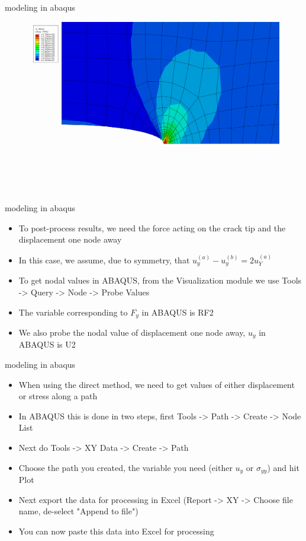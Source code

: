 \documentclass[10pt]{beamer}
\begin{document}
	\begin{frame}{modeling in abaqus}
		\begin{figure}
			\centering
			\includegraphics[width=0.7\linewidth]{../Figures/result}
			\label{fig:results}
		\end{figure}
	\end{frame}
	
	\begin{frame}{modeling in abaqus}
		\begin{itemize}[<+->]
			\item To post-process results, we need the force acting on the crack tip and the displacement one node away
			\item In this case, we assume, due to symmetry, that $u_y^{(a)}-u_y^{(b)} = 2 u_Y^{(a)}$
			\item To get nodal values in ABAQUS, from the Visualization module we use Tools -> Query -> Node -> Probe Values
			\item The variable corresponding to $F_y$ in ABAQUS is RF2
			\item We also probe the nodal value of displacement one node away, $u_y$ in ABAQUS is U2
		\end{itemize}
	\end{frame}
	
	\begin{frame}{modeling in abaqus}
		\begin{itemize}[<+->]
			\item When using the direct method, we need to get values of either displacement or stress along a path
			\item In ABAQUS this is done in two steps, first Tools -> Path -> Create -> Node List
			\item Next do Tools -> XY Data -> Create -> Path
			\item Choose the path you created, the variable you need (either $u_y$ or $\sigma_{yy}$) and hit Plot
			\item Next export the data for processing in Excel (Report -> XY -> Choose file name, de-select "Append to file")
			\item You can now paste this data into Excel for processing
		\end{itemize}
	\end{frame}
	
\end{document}
